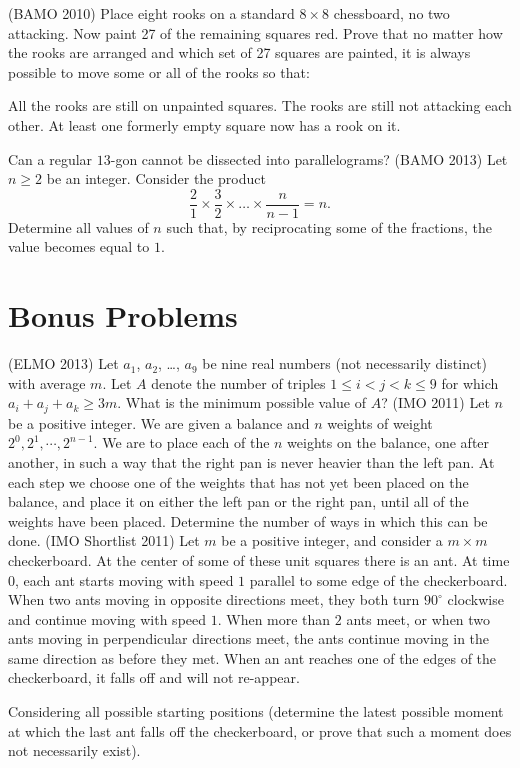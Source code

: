 \documentclass[11pt]{scrartcl}
\begin{document}
\begin{enumerate}
  \ii (BAMO 2010)
  Place eight rooks on a standard $8 \times 8$ chessboard, no two attacking. Now paint 27 of the remaining squares red.  Prove that no matter how the rooks are arranged and which set of 27 squares are painted, it is always possible to move some or all of the rooks so that:
  \begin{itemize}
    \ii All the rooks are still on unpainted squares.
    \ii The rooks are still not attacking each other.
    \ii At least one formerly empty square now has a rook on it.
  \end{itemize} %

  \ii Can a regular $13$-gon cannot be dissected into parallelograms? %
  \ii (BAMO 2013) Let $n \ge 2$ be an integer. Consider the product
  \[ \frac{2}{1} \times \frac{3}{2} \times \dots \times \frac{n}{n-1} = n. \]
  Determine all values of $n$ such that, by reciprocating some of the fractions, the value becomes equal to $1$.

\end{enumerate}

\section{Bonus Problems}
\begin{enumerate}
  \ii (ELMO 2013) Let $a_1$, $a_2$, \dots, $a_9$ be nine real numbers (not necessarily distinct) with average $m$. Let $A$ denote the number of triples $1 \le i < j < k \le 9$ for which $a_i + a_j + a_k \ge 3m$. What is the minimum possible value of $A$?
  \ii (IMO 2011) Let $n$ be a positive integer. We are given a balance and $n$ weights of weight $2^0, 2^1, \cdots, 2^{n-1}$. We are to place each of the $n$ weights on the balance, one after another, in such a way that the right pan is never heavier than the left pan. At each step we choose one of the weights that has not yet been placed on the balance, and place it on either the left pan or the right pan, until all of the weights have been placed.
Determine the number of ways in which this can be done.
  \ii (IMO Shortlist 2011) Let $m$ be a positive integer, and consider a $m\times m$ checkerboard. At the center of some of these unit squares there is an ant. At time $0$, each ant starts moving with speed $1$ parallel to some edge of the checkerboard. When two ants moving in opposite directions meet, they both turn $90^{\circ}$ clockwise and continue moving with speed $1$. When more than $2$ ants meet, or when two ants moving in perpendicular directions meet, the ants continue moving in the same direction as before they met. When an ant reaches one of the edges of the checkerboard, it falls off and will not re-appear. \par Considering all possible starting positions (determine the latest possible moment at which the last ant falls off the checkerboard, or prove that such a moment does not necessarily exist).
\end{enumerate}
\end{document}

